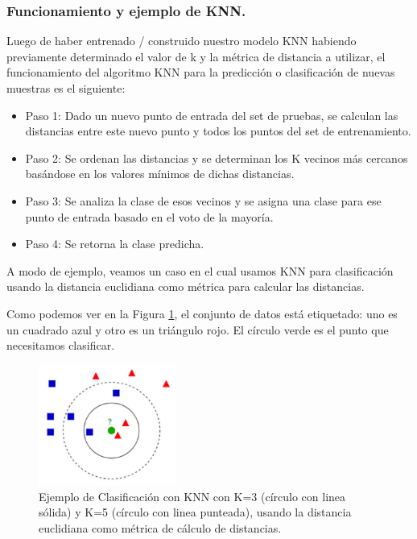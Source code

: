 \documentclass[12pt,a4paper]{article}
\begin{document}
\begin{sloppypar}
\subsubsection{Funcionamiento y ejemplo de KNN.}

Luego de haber entrenado / construido nuestro modelo KNN habiendo previamente determinado el valor de k y la métrica de distancia a utilizar, el funcionamiento del algoritmo KNN para la predicción o clasificación de nuevas muestras es el siguiente: 

\begin{itemize}
\item Paso 1: Dado un nuevo punto de entrada del set de pruebas, se calculan las distancias entre este nuevo punto y todos los puntos del set de entrenamiento.
\item Paso 2: Se ordenan las distancias y se determinan los K vecinos más cercanos basándose en los valores mínimos de dichas distancias.
\item Paso 3: Se analiza la clase de esos vecinos y se asigna una clase para ese punto de entrada basado en el voto de la mayoría.
\item Paso 4: Se retorna la clase predicha.
\end{itemize}

A modo de ejemplo, veamos un caso en el cual usamos KNN para clasificación usando la distancia euclidiana como métrica para calcular las distancias. 

Como podemos ver en la Figura \ref{fig:KNN_example}, el conjunto de datos está etiquetado: uno es un cuadrado azul y otro es un triángulo rojo. El círculo verde es el punto que necesitamos clasificar. 

\begin{figure}[H]    %
 \centering
 \includegraphics[width=0.4\textwidth]{images/KNN_Ejemplo.png}
 \captionsetup{justification=centering,margin=2cm}
 \caption{Ejemplo de Clasificación con KNN con K=3 (círculo con linea sólida) y K=5 (círculo con linea punteada), usando la distancia euclidiana como métrica de cálculo de distancias\cite{KNN_Ejemplo}.} 
 \label{fig:KNN_example}
\end{figure}


\end{sloppypar}
\end{document}
